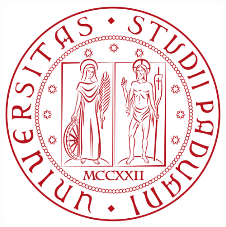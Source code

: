 \setlength\headheight{15pt}
\thispagestyle{empty}

\begin{titlepage}

    \vspace{5mm}


    \begin{figure}[hbtp]
        \centering
        \includegraphics[scale=.13]{Images/frontespizio/UNIPD.png}
    \end{figure}


    \vspace{5mm}



\end{titlepage}
